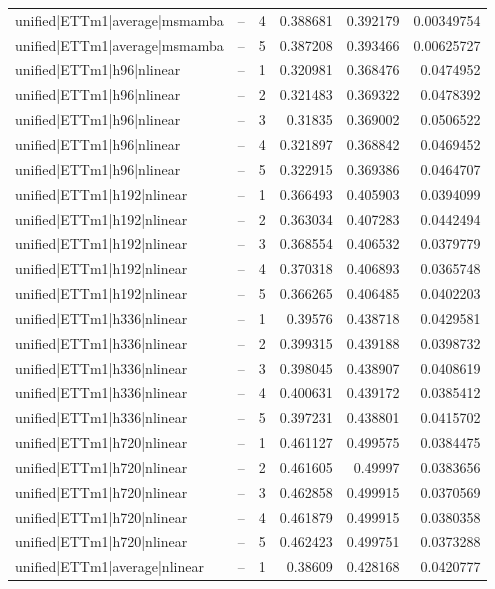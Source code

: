 \begin{longtable}{llrrrr}
unified|ETTm1|average|msmamba & -- & 4 & 0.388681 & 0.392179 & 0.00349754 \\
unified|ETTm1|average|msmamba & -- & 5 & 0.387208 & 0.393466 & 0.00625727 \\
unified|ETTm1|h96|nlinear & -- & 1 & 0.320981 & 0.368476 & 0.0474952 \\
unified|ETTm1|h96|nlinear & -- & 2 & 0.321483 & 0.369322 & 0.0478392 \\
unified|ETTm1|h96|nlinear & -- & 3 & 0.31835 & 0.369002 & 0.0506522 \\
unified|ETTm1|h96|nlinear & -- & 4 & 0.321897 & 0.368842 & 0.0469452 \\
unified|ETTm1|h96|nlinear & -- & 5 & 0.322915 & 0.369386 & 0.0464707 \\
unified|ETTm1|h192|nlinear & -- & 1 & 0.366493 & 0.405903 & 0.0394099 \\
unified|ETTm1|h192|nlinear & -- & 2 & 0.363034 & 0.407283 & 0.0442494 \\
unified|ETTm1|h192|nlinear & -- & 3 & 0.368554 & 0.406532 & 0.0379779 \\
unified|ETTm1|h192|nlinear & -- & 4 & 0.370318 & 0.406893 & 0.0365748 \\
unified|ETTm1|h192|nlinear & -- & 5 & 0.366265 & 0.406485 & 0.0402203 \\
unified|ETTm1|h336|nlinear & -- & 1 & 0.39576 & 0.438718 & 0.0429581 \\
unified|ETTm1|h336|nlinear & -- & 2 & 0.399315 & 0.439188 & 0.0398732 \\
unified|ETTm1|h336|nlinear & -- & 3 & 0.398045 & 0.438907 & 0.0408619 \\
unified|ETTm1|h336|nlinear & -- & 4 & 0.400631 & 0.439172 & 0.0385412 \\
unified|ETTm1|h336|nlinear & -- & 5 & 0.397231 & 0.438801 & 0.0415702 \\
unified|ETTm1|h720|nlinear & -- & 1 & 0.461127 & 0.499575 & 0.0384475 \\
unified|ETTm1|h720|nlinear & -- & 2 & 0.461605 & 0.49997 & 0.0383656 \\
unified|ETTm1|h720|nlinear & -- & 3 & 0.462858 & 0.499915 & 0.0370569 \\
unified|ETTm1|h720|nlinear & -- & 4 & 0.461879 & 0.499915 & 0.0380358 \\
unified|ETTm1|h720|nlinear & -- & 5 & 0.462423 & 0.499751 & 0.0373288 \\
unified|ETTm1|average|nlinear & -- & 1 & 0.38609 & 0.428168 & 0.0420777 \\

\end{longtable}
